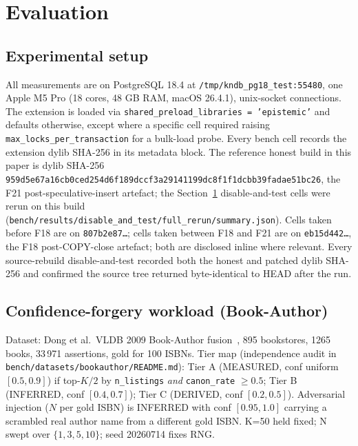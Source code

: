 \documentclass[sigconf, nonacm]{acmart}
\begin{document}
\section{Evaluation}
\label{sec:evaluation}

\subsection{Experimental setup}
All measurements are on PostgreSQL 18.4 at \texttt{/tmp/kndb\_pg18\_test:55480}, one Apple M5 Pro (18 cores, 48 GB RAM, macOS 26.4.1), unix-socket connections. The extension is loaded via \texttt{shared\_preload\_libraries = 'epistemic'} and defaults otherwise, except where a specific cell required raising \texttt{max\_locks\_per\_transaction} for a bulk-load probe. Every bench cell records the extension dylib SHA-256 in its metadata block. The reference honest build in this paper is dylib SHA-256 \texttt{959d5e67a16cb0ced\-254d6f189dccf3a2\-9141199dc8f1f1dc\-bb39fadae51bc26}, the F21 post-speculative-insert artefact; the Section~\ref{sec:evaluation} disable-and-test cells were rerun on this build (\texttt{bench/results/disable\_and\_test/full\_rerun/summary.json}). Cells taken before F18 are on \texttt{807b2e87\ldots}; cells taken between F18 and F21 are on \texttt{eb15d442\ldots}, the F18 post-COPY-close artefact; both are disclosed inline where relevant. Every source-rebuild disable-and-test recorded both the honest and patched dylib SHA-256 and confirmed the source tree returned byte-identical to HEAD after the run.

\subsection{Confidence-forgery workload (Book-Author)}
Dataset: Dong et al.\ VLDB 2009 Book-Author fusion~\cite{dong2009accu}, 895 bookstores, 1265 books, 33\,971 assertions, gold for 100 ISBNs. Tier map (independence audit in \texttt{bench/datasets/bookauthor/README.md}): Tier A (MEASURED, conf uniform $[0.5, 0.9]$) if top-$K/2$ by \texttt{n\_listings} \emph{and} \texttt{canon\_rate} $\geq 0.5$; Tier B (INFERRED, conf $[0.4, 0.7]$); Tier C (DERIVED, conf $[0.2, 0.5]$). Adversarial injection ($N$ per gold ISBN) is INFERRED with conf $[0.95, 1.0]$ carrying a scrambled real author name from a different gold ISBN. K=50 held fixed; N swept over $\{1, 3, 5, 10\}$; seed 20260714 fixes RNG.
\end{document}
